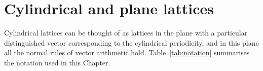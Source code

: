 
%



\section{Cylindrical and plane lattices}\label{sec:latticedef}
Cylindrical lattices can be thought of as lattices in the plane with a particular distinguished vector corresponding to the cylindrical periodicity,  and in this plane all the normal rules of vector arithmetic hold. 
Table~\ref{tab:notation} summarises the notation used in this Chapter.
%
